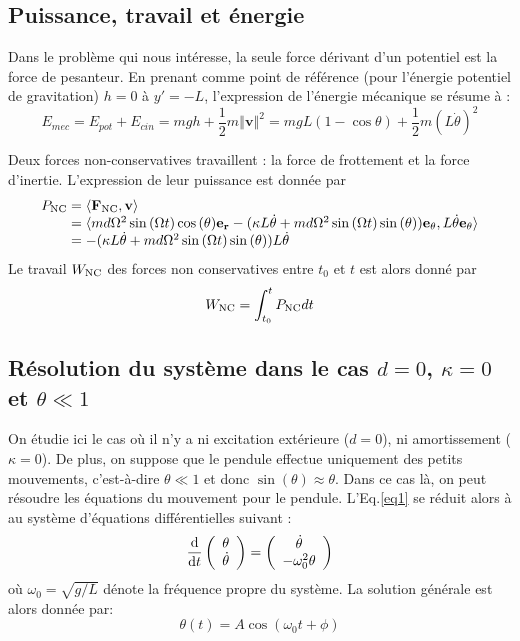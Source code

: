 \documentclass[a4paper,12pt,oneside]{article}
\def \be {\begin{equation}}
\def \ee {\end{equation}}
\def \dd  {{\rm d}}
\def \t {\theta}
\def \vt {\Dot{\theta}}
\newcommand{\norme}[1]{\left\Vert #1 \right\Vert}
\begin{document}
\subsection{Puissance, travail et énergie} 
Dans le problème qui nous intéresse, la seule force dérivant d'un potentiel est la force de pesanteur. En prenant comme point de référence (pour l'énergie potentiel de gravitation) $h=0$ à $y'=-L$, l'expression de l'énergie mécanique se résume à :
\be
E_{mec}=E_{pot}+E_{cin}=mgh+\frac{1}{2}m\norme{\mathbf{v}}^2=mgL(1-\cos{\t})+\frac{1}{2}m(L \vt)^2
\ee

Deux forces non-conservatives travaillent : la force de frottement et la force d'inertie. L'expression de leur puissance est donnée par 
\be 
\begin{array}{r @{{}={}} l}  
P_{\rm NC} & \langle \mathbf{F}_{\rm NC} , \mathbf{v} \rangle \\
& \langle md\Omega^2\sin{(\Omega t)}\cos{(\t)}\mathbf{e_r}-(\kappa L \vt +  md\Omega^2\sin{(\Omega t)}\sin{(\t)})\mathbf{e_\t},L \vt \mathbf{e_\t} \rangle \\
& -(\kappa L \vt +  md\Omega^2\sin{(\Omega t)}\sin{(\t)})L \vt
\end{array}
\ee
Le travail $W_{\rm NC}$ des forces non conservatives entre $t_0$ et $t$ est alors donné par 
\be
W_{\rm NC} = \int_{t_0}^{t}P_{\rm NC} dt
\ee



\subsection{Résolution du système dans le cas $d=0$, $\kappa=0$ et $\t \ll 1$ \label{resolutionEqt}} 
On étudie ici le cas où il n'y a ni excitation extérieure ($d=0$), ni amortissement ($\kappa =0$). De plus, on suppose que le pendule effectue uniquement des petits mouvements, c'est-à-dire $\t \ll 1$ et donc $\sin{(\t)} \approx \t$. Dans ce cas là, on peut résoudre les équations du mouvement pour le pendule.
L'Eq.\eqref{eq1} se réduit alors à au système d'équations différentielles suivant :
\be
\frac{\dd }{\dd t} 
\left( \begin{array}{c} \t \\ \vt  \end{array} \right)
=
\left( \begin{array}{c}
   \vt \\
   -\omega_0^2\theta
\end{array} \right)
\label{eq4}
\ee
où $\omega_0=\sqrt{g/L}$ dénote la fréquence propre du système.
La solution générale est alors donnée par:
\be
\theta(t)=A\cos{(\omega_0t+\phi)}
\label{eq:SolutionGenerale}
\ee
\end{document}
